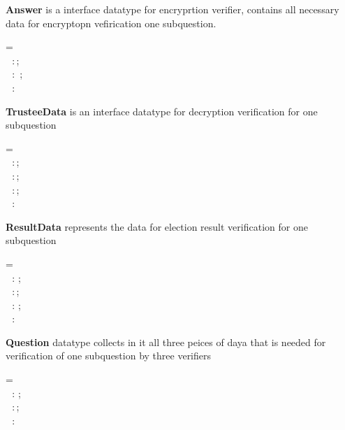 \textbf{Answer} is a interface datatype for encryprtion verifier,
contains all necessary data for encryptopn vefirication one subquestion.\\
\begin{holmath}
     = \HOLTokenLeftrec{}\\
\,\,\,\,:\,;\\
\,\,\,\,:\,\,\HOLTokenProd{}\,;\\
\,\,\,\,:\,\\
\HOLTokenRightrec{}
\end{holmath}  

\textbf{TrusteeData} is an interface datatype for decryption verification for one subquestion\\
\begin{holmath}
     = \HOLTokenLeftrec{}\\
\,\,\,\,:\,;\\
\,\,\,\,:\,;\\
\,\,\,\,:\,;\\
\,\,\,\,:\,\,\\
\HOLTokenRightrec{}
\end{holmath}  

\textbf{ResultData} represents the data for election result verification for one subquestion\\
\begin{holmath}
     = \HOLTokenLeftrec{}\\
\,\,\,\,:\,\,;\\
\,\,\,\,:\,;\\
\,\,\,\,:\,\,;\\
\,\,\,\,:\,\\
\HOLTokenRightrec{}
\end{holmath}  

\textbf{Question} datatype collects in it all three peices of daya that is needed 
for verification of one subquestion by three verifiers\\
\begin{holmath}
     = \HOLTokenLeftrec{}\\
\,\,\,\,:\,\,;\\
\,\,\,\,:\,;\\
\,\,\,\,:\,\\
\HOLTokenRightrec{}
\end{holmath}  


